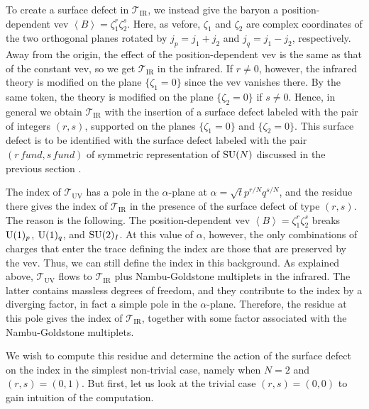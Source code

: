 To create a surface defect in $\mathcal{T}_{\mathrm{IR}}$, we instead
give the baryon a position-dependent vev $\left\langle B\right\rangle = \zeta_{1}^{r}\zeta_{2}^{s}$.
Here, as vefore, $\zeta_{1}$ and $\zeta_{2}$ are complex coordinates
of the two orthogonal planes rotated by $j_{p}=j_{1}+j_{2}$ and $j_{q}=j_{1}-j_{2}$,
respectively. Away from the origin, the effect of the position-dependent
vev is the same as that of the constant vev, so we get $\mathcal{T}_{\mathrm{IR}}$
in the infrared. If $r\neq0$, however, the infrared theory is modified
on the plane $\{\zeta_{1}=0\}$ since the vev vanishes there. By the
same token, the theory is modified on the plane $\{\zeta_{2}=0\}$
if $s\neq0$. Hence, in general we obtain $\mathcal{T}_{\mathrm{IR}}$
with the insertion of a surface defect labeled with the pair of integers
$(r,s)$, supported on the planes $\{\zeta_{1}=0\}$ and $\{\zeta_{2}=0\}$.
This surface defect is to be identified with the surface defect labeled
with the pair $(r\,fund,s\,fund)$ of symmetric representation of
$\mathrm{SU}(N)$ discussed in the previous section \cite{Gadde:2013dda}. 

The index of $\mathcal{T}_{\mathrm{UV}}$ has a pole in the $\alpha$-plane
at $\alpha=\sqrt{t}p^{r/N}q^{s/N}$, and the residue there gives the
index of $\mathcal{T}_{\mathrm{IR}}$ in the presence of the surface
defect of type $(r,s)$. The reason is the following. The position-dependent
vev $\left\langle B\right\rangle =\zeta_{1}^{r}\zeta_{2}^{s}$ breaks
$\mathrm{U}(1)_{p}$, $\mathrm{U}(1)_{q}$, and $\mathrm{SU}(2)_{I}$. At this value of $\alpha$,
however, the only combinations of charges that enter the trace defining
the index are those that are preserved by the vev. Thus, we can still
define the index in this background. As explained above, $\mathcal{T}_{\mathrm{UV}}$
flows to $\mathcal{T}_{\mathrm{IR}}$ plus Nambu-Goldstone multiplets
in the infrared. The latter contains massless degrees of freedom,
and they contribute to the index by a diverging factor, in fact a
simple pole in the $\alpha$-plane. Therefore, the residue at this
pole gives the index of $\mathcal{T}_{\mathrm{IR}}$, together with
some factor associated with the Nambu-Goldstone multiplets.

We wish to compute this residue and determine the action of the surface
defect on the index in the simplest non-trivial case, namely when
$N=2$ and $(r,s)=(0,1)$. But first, let us look at the trivial case
$(r,s)=(0,0)$ to gain intuition of the computation.

